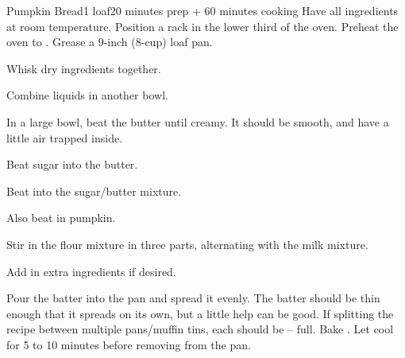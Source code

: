 \documentclass[../Cookbook.tex]{subfiles}
\begin{document}
\begin{recipe}{Pumpkin Bread}{1 loaf}{20 minutes prep + 60 minutes cooking}
	Have all ingredients at room temperature. Position a rack in the lower third of the oven. Preheat the oven to . Grease a 9-inch (8-cup) loaf pan.

	Whisk dry ingredients together.

	Combine liquids in another bowl.

	In a large bowl, beat the butter until creamy. It should be smooth, and have a little air trapped inside.

	Beat sugar into the butter.

	Beat into the sugar/butter mixture.

	Also beat in pumpkin.

	\newstep
	Stir in the flour mixture in three parts, alternating with the milk mixture.

	Add in extra ingredients if desired.

	\newstep
	Pour the batter into the pan and spread it evenly. The batter should be thin enough that it spreads on its own, but a little help can be good. If splitting the recipe between multiple pans/muffin tins, each should be -- full.
	Bake . Let cool for 5 to 10 minutes before removing from the pan.
\end{recipe}
\end{document}
